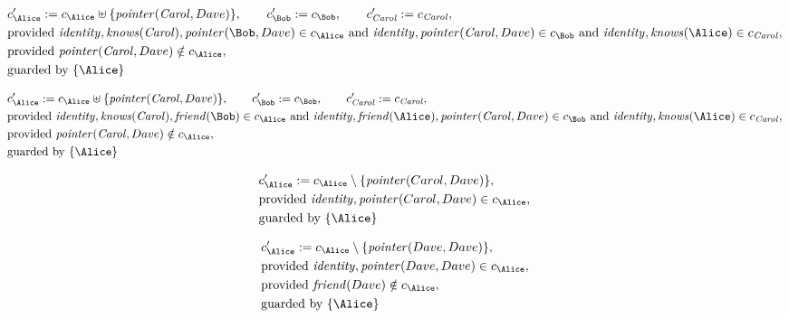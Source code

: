 \begin{align*}
&
c'_
{
\Alice
}
 := 
c_
{
\Alice
}
 \uplus 
\{
\mathit{
pointer
}
(
\mathit{Carol}
,
Dave
)
\}
, \qquad 
c'_
{
\Bob
}
 := 
c_
{
\Bob
}
, \qquad 
c'_
{
\mathit{Carol}
}
 := 
c_
{
\mathit{Carol}
}
,\\
&
\text{provided } 
\mathit{
identity
}
,
\mathit{
knows
}
(
\mathit{Carol}
)
,
\mathit{
pointer
}
(
\Bob
,
Dave
)
 \in c_
{
\Alice
}
 \text{ and } 
\mathit{
identity
}
,
\mathit{
pointer
}
(
\mathit{Carol}
,
Dave
)
 \in c_
{
\Bob
}
 \text{ and } 
\mathit{
identity
}
,
\mathit{
knows
}
(
\Alice
)
 \in c_
{
\mathit{Carol}
}
,\\
&
\text{provided } 
\mathit{
pointer
}
(
\mathit{Carol}
,
Dave
)
 \notin c_
{
\Alice
}
,\\
&
\text{guarded by } \{
\Alice
\}
\end{align*}

\begin{align*}
&
c'_
{
\Alice
}
 := 
c_
{
\Alice
}
 \uplus 
\{
\mathit{
pointer
}
(
\mathit{Carol}
,
Dave
)
\}
, \qquad 
c'_
{
\Bob
}
 := 
c_
{
\Bob
}
, \qquad 
c'_
{
\mathit{Carol}
}
 := 
c_
{
\mathit{Carol}
}
,\\
&
\text{provided } 
\mathit{
identity
}
,
\mathit{
knows
}
(
\mathit{Carol}
)
,
\mathit{
friend
}
(
\Bob
)
 \in c_
{
\Alice
}
 \text{ and } 
\mathit{
identity
}
,
\mathit{
friend
}
(
\Alice
)
,
\mathit{
pointer
}
(
\mathit{Carol}
,
Dave
)
 \in c_
{
\Bob
}
 \text{ and } 
\mathit{
identity
}
,
\mathit{
knows
}
(
\Alice
)
 \in c_
{
\mathit{Carol}
}
,\\
&
\text{provided } 
\mathit{
pointer
}
(
\mathit{Carol}
,
Dave
)
 \notin c_
{
\Alice
}
,\\
&
\text{guarded by } \{
\Alice
\}
\end{align*}

\begin{align*}
&
c'_
{
\Alice
}
 := 
c_
{
\Alice
}
 \setminus 
\{
\mathit{
pointer
}
(
Carol
,
Dave
)
\}
,\\
&
\text{provided } 
\mathit{
identity
}
,
\mathit{
pointer
}
(
Carol
,
Dave
)
 \in c_
{
\Alice
}
,\\
&
\text{guarded by } \{
\Alice
\}
\end{align*}

\begin{align*}
&
c'_
{
\Alice
}
 := 
c_
{
\Alice
}
 \setminus 
\{
\mathit{
pointer
}
(
Dave
,
Dave
)
\}
,\\
&
\text{provided } 
\mathit{
identity
}
,
\mathit{
pointer
}
(
Dave
,
Dave
)
 \in c_
{
\Alice
}
,\\
&
\text{provided } 
\mathit{
friend
}
(
Dave
)
 \notin c_
{
\Alice
}
,\\
&
\text{guarded by } \{
\Alice
\}
\end{align*}
